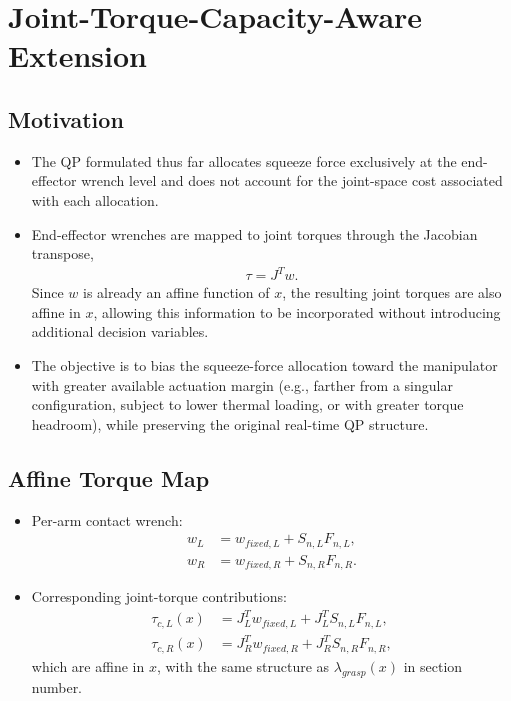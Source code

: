 \documentclass[conference]{IEEEtran}
\begin{document}
\section{Joint-Torque-Capacity-Aware Extension}

\subsection{Motivation}

\begin{itemize}
    \item The QP formulated thus far allocates squeeze force exclusively at the end-effector wrench level and does not account for the joint-space cost associated with each allocation.

    \item End-effector wrenches are mapped to joint torques through the Jacobian transpose,
    \begin{align}
        \tau
        =
        J^{T}w.
    \end{align}
    Since \(w\) is already an affine function of \(x\), the resulting joint torques are also affine in \(x\), allowing this information to be incorporated without introducing additional decision variables.

    \item The objective is to bias the squeeze-force allocation toward the manipulator with greater available actuation margin (e.g., farther from a singular configuration, subject to lower thermal loading, or with greater torque headroom), while preserving the original real-time QP structure.
\end{itemize}

\subsection{Affine Torque Map}
\begin{itemize}
    \item Per-arm contact wrench:
    \[
    \begin{aligned}
    w_L &= w_{fixed,L} + S_{n,L}F_{n,L},\\
    w_R &= w_{fixed,R} + S_{n,R}F_{n,R}.
    \end{aligned}
    \]

    \item Corresponding joint-torque contributions:
    \[
    \begin{aligned}
    \tau_{c,L}(x) &= J_L^T w_{fixed,L} + J_L^T S_{n,L}F_{n,L},\\
    \tau_{c,R}(x) &= J_R^T w_{fixed,R} + J_R^T S_{n,R}F_{n,R},
    \end{aligned}
    \]
    which are affine in \(x\), with the same structure as \(\lambda_{grasp}(x)\) in section number.
\end{itemize}
\end{document}
